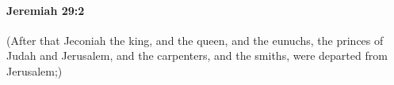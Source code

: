 
		\paragraph{Jeremiah 29:2} %
			\label{JEREMIAH-29-2}

			(After that Jeconiah the king, and the queen, and the eunuchs, the princes of Judah and Jerusalem, and the carpenters, and the smiths, were departed from Jerusalem;)



